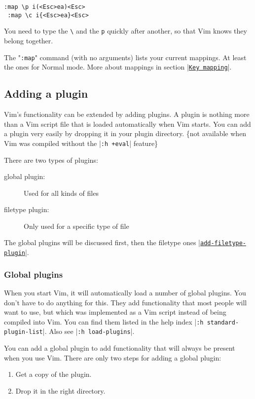  \begin{Verbatim}[samepage=true]
 :map \p i(<Esc>ea)<Esc>
 :map \c i{<Esc>ea}<Esc>
 \end{Verbatim}

You need to type the \verb!\! and the \verb!p! quickly after another, so that Vim knows they belong together.

The "\verb!:map!" command (with no arguments) lists your current mappings.
At least the ones for Normal mode.
More about mappings in section |\hyperref[Key mapping]{\texttt{Key mapping}}|.

\subsection{Adding a plugin}
\label{add-plugin}
\label{plugin}

Vim's functionality can be extended by adding plugins.
A plugin is nothing more than a Vim script file that is loaded automatically when Vim starts.
You can add a plugin very easily by dropping it in your plugin directory.
\{not available when Vim was compiled without the |\verb!:h +eval!| feature\}

There are two types of plugins:
\begin{description}
				\item [global plugin:] Used for all kinds of files
				\item [filetype plugin:] Only used for a specific type of file
\end{description}

The global plugins will be discussed first, then the filetype ones \hyperref[add-filetype-plugin]{|\texttt{add-filetype-plugin}|}.

\subsubsection{Global plugins}
\label{standard-plugin}

When you start Vim, it will automatically load a number of global plugins.
You don't have to do anything for this.
They add functionality that most people will want to use, but which was implemented as a Vim script instead of being compiled into Vim.
You can find them listed in the help index |\verb!:h standard-plugin-list!|.
Also see |\verb!:h load-plugins!|.

\label{add-global-plugin}
You can add a global plugin to add functionality that will always be present
when you use Vim.  There are only two steps for adding a global plugin:
\begin{enumerate}
				\item Get a copy of the plugin.
				\item Drop it in the right directory.
\end{enumerate}

